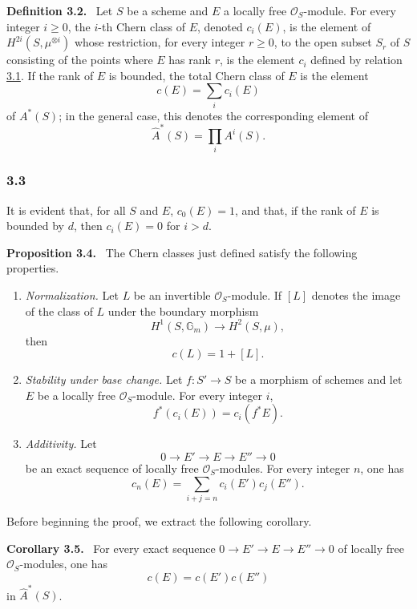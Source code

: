 \documentclass[11pt]{article}
\newenvironment{statement}[1]{\par\medskip\noindent\textbf{#1.}\ }{\par\medskip}
\begin{document}
\label{sga5:VII:definition:3.2}\begin{statement}{Definition 3.2}
Let $S$ be a scheme and $E$ a locally free $\mathcal O_S$-module. For every integer $i\ge0$, the $i$-th Chern class of $E$, denoted $c_i(E)$, is the element of $H^{2i}(S,\mu^{\otimes i})$ whose restriction, for every integer $r\ge0$, to the open subset $S_r$ of $S$ consisting of the points where $E$ has rank $r$, is the element $c_i$ defined by relation \hyperref[sga5:VII:equation:3.1]{3.1}. If the rank of $E$ is bounded, the total Chern class of $E$ is the element
\[
c(E)=\sum_i c_i(E)
\]
of $A^*(S)$; in the general case, this denotes the corresponding element of
\[
\widehat A^*(S)=\prod_i A^i(S).
\]
\end{statement}

\subsubsection*{3.3}\label{sga5:VII:subsubsection:3.3}
It is evident that, for all $S$ and $E$, $c_0(E)=1$, and that, if the rank of $E$ is bounded by $d$, then $c_i(E)=0$ for $i>d$.

\label{sga5:VII:proposition:3.4}\begin{statement}{Proposition 3.4}
The Chern classes just defined satisfy the following properties.
\begin{enumerate}[label=(\roman*)]
\item \emph{Normalization.} Let $L$ be an invertible $\mathcal O_S$-module. If $[L]$ denotes the image of the class of $L$ under the boundary morphism
\[
H^1(S,\mathbb G_m)\longrightarrow H^2(S,\mu),
\]
then
\[
c(L)=1+[L].
\]
\item \emph{Stability under base change.} Let $f:S'\to S$ be a morphism of schemes and let $E$ be a locally free $\mathcal O_S$-module. For every integer $i$,
\[
f^*(c_i(E))=c_i(f^*E).
\]
\item \emph{Additivity.} Let
\[
0\to E'\to E\to E''\to0
\]
be an exact sequence of locally free $\mathcal O_S$-modules. For every integer $n$, one has
\[
c_n(E)=\sum_{i+j=n}c_i(E')c_j(E'').
\]
\end{enumerate}
\end{statement}

Before beginning the proof, we extract the following corollary.

\label{sga5:VII:corollary:3.5}\begin{statement}{Corollary 3.5}
For every exact sequence $0\to E'\to E\to E''\to0$ of locally free $\mathcal O_S$-modules, one has
\[
c(E)=c(E')c(E'')
\]
in $\widehat A^*(S)$.
\end{statement}
\end{document}
